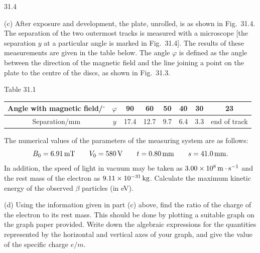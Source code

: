 \begin{figbox}{31.4}
\end{figbox}

(c) After exposure and development, the plate, unrolled, is as shown in Fig.~31.4. The separation of the two outermost tracks is measured with a microscope [the separation $y$ at a particular angle is marked in Fig.~31.4]. The results of these measurements are given in the table below. The angle $\varphi$ is defined as the angle between the direction of the magnetic field and the line joining a point on the plate to the centre of the discs, as shown in Fig.~31.3.

\begin{center}
Table 31.1
\end{center}
\begin{center}
\begin{tabular}{|c|c|c|c|c|c|c|c|}
\hline
Angle with magnetic field/$^\circ$ & $\varphi$ & 90 & 60 & 50 & 40 & 30 & 23\\
\hline
Separation/mm & $y$ & 17.4 & 12.7 & 9.7 & 6.4 & 3.3 & end of track\\
\hline
\end{tabular}
\end{center}

The numerical values of the parameters of the measuring system are as follows:
\begin{equation*}
B_0=6.91\,\mathrm{mT}\qquad V_0=580\,\mathrm{V}\qquad
t=0.80\,\mathrm{mm}\qquad s=41.0\,\mathrm{mm} .
\end{equation*}
In addition, the speed of light in vacuum may be taken as $3.00\times10^8\,\mathrm{m\cdot s^{-1}}$ and the rest mass of the electron as $9.11\times10^{-31}\,\mathrm{kg}$. Calculate the maximum kinetic energy of the observed $\beta$ particles (in eV).

(d) Using the information given in part (c) above, find the ratio of the charge of the electron to its rest mass. This should be done by plotting a suitable graph on the graph paper provided. Write down the algebraic expressions for the quantities represented by the horizontal and vertical axes of your graph, and give the value of the specific charge $e/m$.

